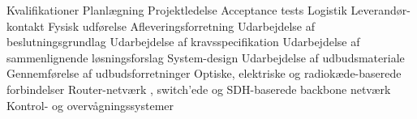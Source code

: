 \begin{rubric}{Kvalifikationer}
 \entry* Planlægning
 \entry* Projektledelse
 \entry* Acceptance tests
 \entry* Logistik
 \entry* Leverandør-kontakt
 \entry* Fysisk udførelse
 \entry* Afleveringsforretning
 \entry* Udarbejdelse af beslutningsgrundlag 
 \entry* Udarbejdelse af kravsspecifikation
 \entry* Udarbejdelse af sammenlignende løsningsforslag
 \entry* System-design
 \entry* Udarbejdelse af udbudsmateriale
 \entry* Gennemførelse af udbudsforretninger
 \entry* Optiske, elektriske og radiokæde-baserede forbindelser
 \entry* Router-netværk , switch'ede og SDH-baserede backbone netværk
 \entry* Kontrol- og overvågningssystemer
\end{rubric}
